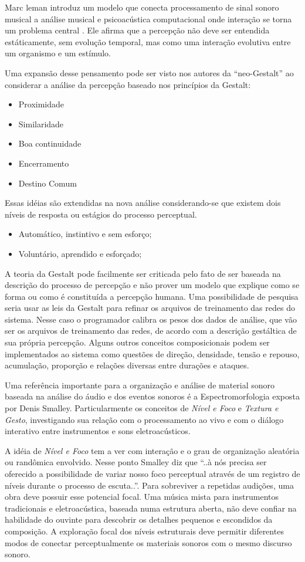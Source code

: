 \documentclass{ppgmus}
\begin{document}
Marc leman introduz um modelo que conecta processamento de 
sinal sonoro musical a análise musical e psicoacústica computacional onde interação
se torna um problema central \cite{leman96:gestalt}. Ele afirma que a percepção não deve ser entendida estáticamente,
sem evolução temporal, mas como uma interação evolutiva entre um organismo e um estímulo.

Uma expansão desse pensamento pode ser visto nos autores da ``neo-Gestalt'' ao considerar
a análise da percepção baseado nos princípios da Gestalt:
\begin{itemize}
 \item Proximidade
  \item Similaridade
  \item Boa continuidade
  \item Encerramento
  \item Destino Comum
\end{itemize}
Essas idéias são extendidas na nova análise considerando-se que existem dois níveis de
resposta ou estágios do processo perceptual.
\begin{itemize}
 \item Automático, instintivo e sem esforço;
  \item Voluntário, aprendido e esforçado;
\end{itemize}


A teoria da Gestalt pode facilmente ser criticada pelo fato de ser baseada na descrição
do processo de percepção e não prover um modelo que explique como se forma ou como é constituída 
a percepção humana. 
Uma possibilidade de pesquisa seria usar as leis da Gestalt para refinar os arquivos de treinamento das redes 
do sistema. Nesse caso o programador calibra os pesos dos dados de análise, que vão ser os arquivos de 
treinamento das redes, de acordo com a descrição gestáltica de sua própria percepção. Alguns outros 
conceitos composicionais podem ser implementados ao sistema como questões de direção, densidade, tensão
 e repouso, acumulação, proporção e relações diversas entre durações e ataques.

Uma referência importante para a organização e análise de material sonoro baseada
na análise do áudio e dos eventos sonoros é a Espectromorfologia exposta por Denis
Smalley. Particularmente os conceitos de \textit{Nível e Foco} e \textit{Textura e Gesto},
investigando sua relação com o processamento ao vivo e com o diálogo interativo entre
instrumentos e sons eletroacústicos.

A idéia de \textit{Nível e Foco} tem a ver com interação e o grau de organização aleatória
ou randômica envolvido. Nesse ponto Smalley diz que ``..à nós precisa ser oferecido
a possibilidade de variar nosso foco perceptual através de um registro de níveis 
durante o processo de escuta..''. Para sobreviver a repetidas audições, uma obra deve 
possuir esse potencial focal. Uma música mista para instrumentos tradicionais e eletroacústica, 
baseada numa estrutura aberta, não deve confiar na habilidade do ouvinte para descobrir
os detalhes pequenos e escondidos da composição. A exploração focal dos níveis estruturais
deve permitir diferentes modos de conectar perceptualmente os materiais sonoros com 
o mesmo discurso sonoro. 
\end{document}
